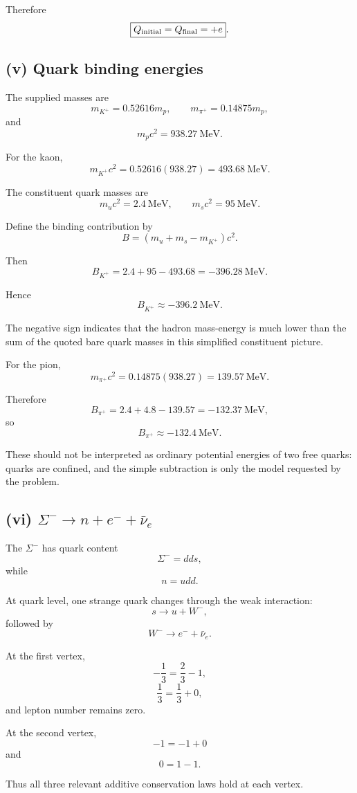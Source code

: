 \documentclass[11pt,a4paper]{article}
\begin{document}
Therefore
\[
\boxed{Q_{\rm initial}=Q_{\rm final}=+e}.
\]

\subsection{(v) Quark binding energies}

The supplied masses are
\[
m_{K^+}=0.52616m_p,
\qquad
m_{\pi^+}=0.14875m_p,
\]
and
\[
m_pc^2=938.27\ \mathrm{MeV}.
\]

For the kaon,
\[
m_{K^+}c^2
=
0.52616(938.27)
=
493.68\ \mathrm{MeV}.
\]

The constituent quark masses are
\[
m_uc^2=2.4\ \mathrm{MeV},
\qquad
m_sc^2=95\ \mathrm{MeV}.
\]

Define the binding contribution by
\[
B=
\left(m_u+m_s-m_{K^+}\right)c^2.
\]

Then
\[
B_{K^+}
=
2.4+95-493.68
=
-396.28\ \mathrm{MeV}.
\]

Hence
\[
\boxed{B_{K^+}\approx-396.2\ \mathrm{MeV}}.
\]

The negative sign indicates that the hadron mass-energy is much lower than the sum
of the quoted bare quark masses in this simplified constituent picture.

For the pion,
\[
m_{\pi^+}c^2
=
0.14875(938.27)
=
139.57\ \mathrm{MeV}.
\]

Therefore
\[
B_{\pi^+}
=
2.4+4.8-139.57
=
-132.37\ \mathrm{MeV},
\]
so
\[
\boxed{B_{\pi^+}\approx-132.4\ \mathrm{MeV}}.
\]

These should not be interpreted as ordinary potential energies of two free quarks:
quarks are confined, and the simple subtraction is only the model requested by the
problem.

\subsection{(vi) $\Sigma^-\rightarrow n+e^-+\bar\nu_e$}

The $\Sigma^-$ has quark content
\[
\Sigma^-=dds,
\]
while
\[
n=udd.
\]

At quark level, one strange quark changes through the weak interaction:
\[
s\rightarrow u+W^-,
\]
followed by
\[
W^-\rightarrow e^-+\bar\nu_e.
\]

At the first vertex,
\[
-\frac13=\frac23-1,
\]
\[
\frac13=\frac13+0,
\]
and lepton number remains zero.

At the second vertex,
\[
-1=-1+0
\]
and
\[
0=1-1.
\]

Thus all three relevant additive conservation laws hold at each vertex.
\end{document}
